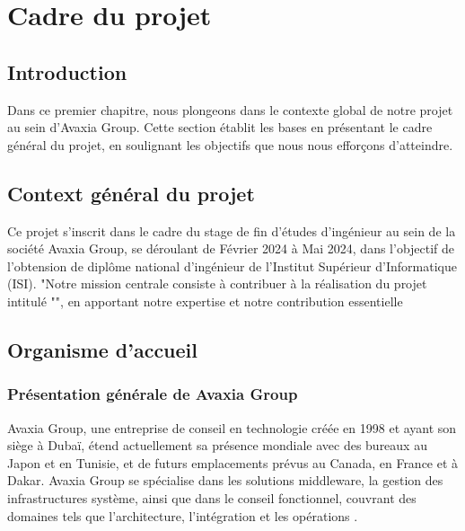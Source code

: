 \chapter{Cadre du projet}
\section*{Introduction}
Dans ce premier chapitre, nous plongeons dans le contexte global de notre projet au sein d'Avaxia Group. Cette section établit les bases en présentant le cadre général du projet, en soulignant les objectifs que nous nous efforçons d'atteindre.


\section {Context général du projet}
\par Ce projet s'inscrit dans le cadre du stage de fin d'études d'ingénieur au sein de la société Avaxia Group, se déroulant de Février 2024 à Mai 2024, dans l'objectif de l'obtension de diplôme national d'ingénieur de l'Institut Supérieur d'Informatique (ISI). 
"Notre mission centrale consiste à contribuer à la réalisation du projet intitulé "", en apportant notre expertise et notre contribution essentielle
\section[Organisme d'accueil]{Organisme d'accueil}
\subsection{Présentation générale de Avaxia Group}
\par Avaxia Group, une entreprise de conseil en technologie créée en 1998 et ayant son siège à Dubaï, étend actuellement sa présence mondiale avec des bureaux au Japon et en Tunisie, et de futurs emplacements prévus au Canada, en France et à Dakar. Avaxia Group se spécialise dans les solutions middleware, la gestion des infrastructures système, ainsi que dans le conseil fonctionnel, couvrant des domaines tels que l'architecture, l'intégration et les opérations \cite{avaxia}.
